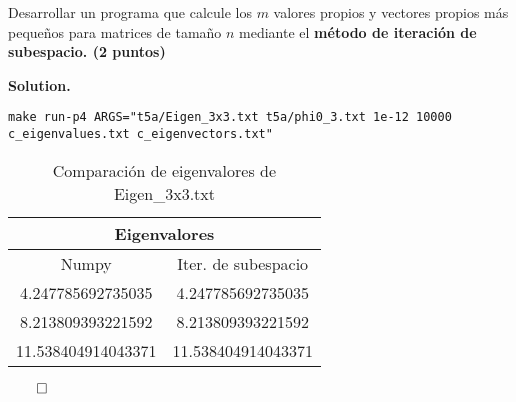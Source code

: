 \documentclass{article}
\theoremstyle{problemstyle}
\newenvironment{solution}{%
  \begin{mdframed}[linewidth=0.8pt,linecolor=Gray,backgroundcolor=Gray!5,roundcorner=5pt]%
  \noindent\textbf{Solution.}%
}{%
\hfill $ \qed $ 
  \end{mdframed}%
}
\begin{document}
\begin{problem}
Desarrollar un programa que calcule los $ m $ valores propios y vectores
propios más peque\~nos para matrices de tama\~no $ n $ mediante el
\textbf{m\'etodo de iteraci\'on de subespacio. (2 puntos)}
\end{problem}
\begin{solution}
\begin{center}
  \texttt{make run-p4 ARGS="t5a/Eigen\_3x3.txt t5a/phi0\_3.txt 1e-12 10000 c\_eigenvalues.txt c\_eigenvectors.txt"}
\end{center}
\begin{table}[H]
    \begin{center}
        \begin{tabular}{|c|c|}
            \multicolumn{2}{c}{Eigenvalores}   \\
            \hline
            Numpy             & Iter. de subespacio\\
            \hline

            4.247785692735035 & 4.247785692735035 \\
            \hline
            8.213809393221592 & 8.213809393221592 \\
            \hline
            11.538404914043371 & 11.538404914043371 \\
            \hline
        \end{tabular}
    \end{center}
    \caption{Comparaci\'on de eigenvalores de Eigen\_3x3.txt}\label{tab:evals3x3_identical}
\end{table}


\end{solution}
\end{document}
